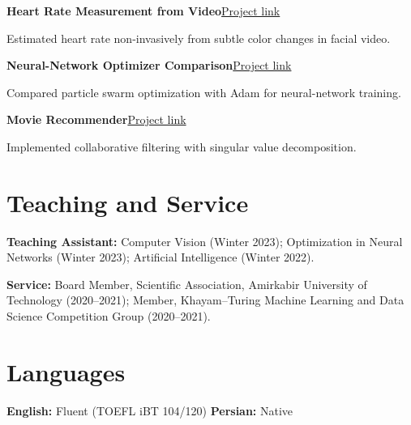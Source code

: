 \documentclass[10pt,letterpaper]{article}
\newcommand{\project}[3]{%
  \needspace{3\baselineskip}%
  \textbf{#1}\hfill\href{#2}{Project link}\par
  #3\par\vspace{0.25em}%
}
\begin{document}
\project
  {Heart Rate Measurement from Video}
  {https://github.com/pouya-parsa/heart_rate_estimation}
  {Estimated heart rate non-invasively from subtle color changes in facial video.}

\project
  {Neural-Network Optimizer Comparison}
  {https://github.com/pouya-parsa/Applied_AI_Projects/blob/main/optimizers.pdf}
  {Compared particle swarm optimization with Adam for neural-network training.}

\project
  {Movie Recommender}
  {https://github.com/pouya-parsa/movie_recommender}
  {Implemented collaborative filtering with singular value decomposition.}

\section{Teaching and Service}

\textbf{Teaching Assistant:} Computer Vision (Winter 2023); Optimization in Neural Networks (Winter 2023); Artificial Intelligence (Winter 2022).\par
\textbf{Service:} Board Member, Scientific Association, Amirkabir University of Technology (2020--2021); Member, Khayam--Turing Machine Learning and Data Science Competition Group (2020--2021).

\section{Languages}

\textbf{English:} Fluent (TOEFL iBT 104/120) \quad
\textbf{Persian:} Native
\end{document}

